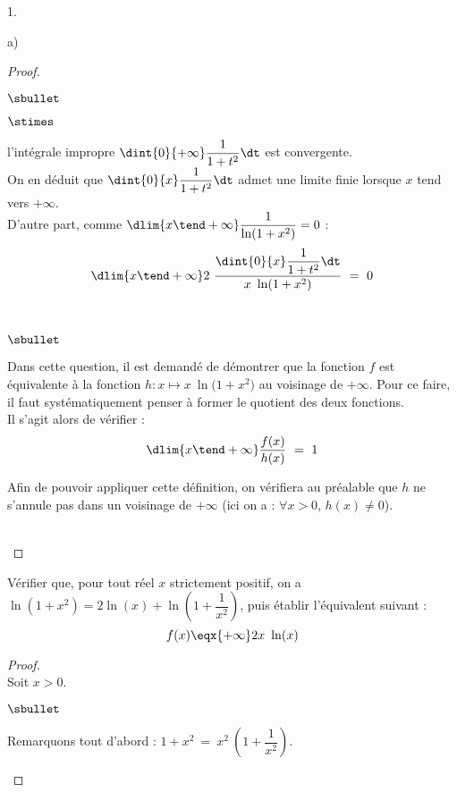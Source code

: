 \documentclass[11pt]{article}%
\begin{document}
\begin{noliste}{1.}
\begin{noliste}{a)}
\begin{proof}
\begin{noliste}{$\sbullet$}
\begin{noliste}{$\stimes$}
        \item l'intégrale impropre $\dint{0}{+\infty} \dfrac{1}{1 +
            t^2} \dt$ est convergente.\\
          On en déduit que $\dint{0}{x} \dfrac{1}{1 + t^2} \dt$ admet
          une limite finie lorsque $x$ tend vers $+\infty$.\\
          D'autre part, comme $\dlim{x \tend +\infty} \dfrac{1}{\ln(1
            + x^2)} = 0$ :
          \[
          \dlim{x \tend +\infty} 2 \ \dfrac{\dint{0}{x} \dfrac{1}{1 +
              t^2} \dt}{x \ \ln(1 + x^2)} \ = \ 0
          \]
        \end{noliste}
      \end{noliste}
      ~\\[-.8cm]


      \newpage


      \begin{remark}%
        \begin{noliste}{$\sbullet$}
        \item Dans cette question, il est demandé de démontrer que la
          fonction $f$ est équivalente à la fonction $h : x \mapsto x
          \ \ln\big( 1 + x^2 \big)$ au voisinage de $+\infty$. Pour ce
          faire, il faut systématiquement penser à former le quotient
          des deux fonctions.\\
          Il s'agit alors de vérifier :
          \[
          \dlim{x \tend +\infty} \dfrac{f(x)}{h(x)} \ = \ 1
          \]
        \item Afin de pouvoir appliquer cette définition, on vérifiera
          au préalable que $h$ ne s'annule pas dans un voisinage de
          $+\infty$ (ici on a : $\forall x > 0$, $h(x) \neq 0$).
        \end{noliste}
      \end{remark}~\\[-1.5cm]
    \end{proof}
    
  \item Vérifier que, pour tout réel $x$ strictement positif, on a
    $\ln(1 + x^2) = 2 \ln(x) + \ln \left( 1 + \dfrac{1}{x^2} \right)$,
    puis établir l'équivalent suivant :
    \[
    f(x) \eqx{+\infty} 2x \ \ln(x)
    \]

    \begin{proof}~\\%
      Soit $x > 0$.
      \begin{noliste}{$\sbullet$}
      \item Remarquons tout d'abord : $1 + x^2 \ = \ x^2 \ \left(1 +
          \dfrac{1}{x^2} \right)$.


\end{noliste}
\end{proof}
\end{noliste}
\end{noliste}
\end{document}
